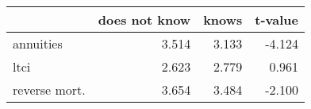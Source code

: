 \begin{tabular}{lrrr}
\toprule
{} &  does not know &  knows &  t-value \\
\midrule
annuities     &          3.514 &  3.133 &   -4.124 \\
ltci          &          2.623 &  2.779 &    0.961 \\
reverse mort. &          3.654 &  3.484 &   -2.100 \\
\bottomrule
\end{tabular}
